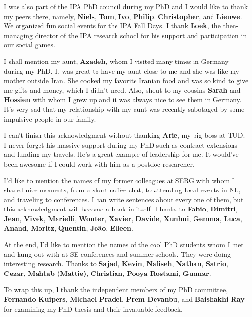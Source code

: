 I was also part of the IPA PhD council during my PhD and I would like to thank my peers there, namely, \textbf{Niels}, \textbf{Tom}, \textbf{Ivo}, \textbf{Philip}, \textbf{Christopher}, and \textbf{Lieuwe}. We organized fun social events for the IPA Fall Days. I thank \textbf{Loek}, the then-managing director of the IPA research school for his support and participation in our social games.

I shall mention my aunt, \textbf{Azadeh}, whom I visited many times in Germany during my PhD. It was great to have my aunt close to me and she was like my mother outside Iran. She cooked my favorite Iranian food and was so kind to give me gifts and money, which I didn't need. Also, shout to my cousins \textbf{Sarah} and \textbf{Hossien} with whom I grew up and it was always nice to see them in Germany. It's very sad that my relationship with my aunt was recently sabotaged by some impulsive people in our family.

I can't finish this acknowledgment without thanking \textbf{Arie}, my big boss at TUD. I never forget his massive support during my PhD such as contract extensions and funding my travels. He's a great example of leadership for me. It would've been awesome if I could work with him as a postdoc researcher. 

I'd like to mention the names of my former colleagues at SERG with whom I shared nice moments, from a short coffee chat, to attending local events in NL, and traveling to conferences. I can write sentences about every one of them, but this acknowledgment will become a book in itself. Thanks to \textbf{Fabio}, \textbf{Dimitri}, \textbf{Jean}, \textbf{Vivek}, \textbf{Marielli}, \textbf{Wouter}, \textbf{Xavier}, \textbf{Davide}, \textbf{Xunhui}, \textbf{Gemma}, \textbf{Luca}, \textbf{Anand}, \textbf{Moritz}, \textbf{Quentin}, \textbf{João}, \textbf{Eileen}.

At the end, I'd like to mention the names of the cool PhD students whom I met and hung out with at SE conferences and summer schools. They were doing interesting research. Thanks to \textbf{Sajad}, \textbf{Kevin}, \textbf{Nafiseh}, \textbf{Nathan}, \textbf{Satrio}, \textbf{Cezar}, \textbf{Mahtab (Mattie)}, \textbf{Christian}, \textbf{Pooya Rostami}, \textbf{Gunnar}.

To wrap this up, I thank the independent members of my PhD committee, \textbf{Fernando Kuipers}, \textbf{
Michael Pradel}, \textbf{Prem Devanbu}, and \textbf{Baishakhi Ray} for examining my PhD thesis and their invaluable feedback.

